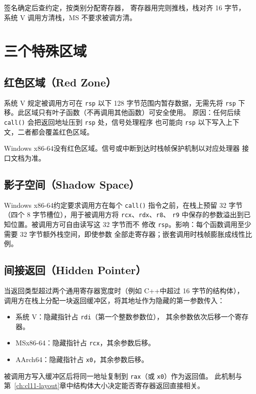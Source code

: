 \documentclass[12pt,a4paper,fontset=fandol]{ctexbook}
\newcommand{\cpp}[1]{C++#1}
\newcommand{\Fn}[1]{\texttt{#1()}}
\newcommand{\Tp}[1]{\texttt{#1}}
\newcommand{\Win}{\textsf{Windows}}
\newcommand{\xSixtyFour}{\textsf{x86-64}}
\newcommand{\ArmSixtyFour}{\textsf{AArch64}}
\begin{document}
\begin{flow}[title={参数去向}]
签名确定后查约定，按类别分配寄存器，
寄存器用完则推栈，栈对齐 16 字节，
系统 V 调用方清栈，MS 不要求被调方清。
\end{flow}

\section{三个特殊区域}\label{sec:cl10-special-zones}

\subsection{红色区域（Red Zone）}\label{sec:cl10-redzone}

\begin{abibox}[title={红色区域}]
系统 V 规定被调用方可在 \Tp{rsp} 以下 128 字节范围内暂存数据，无需先将
\Tp{rsp} 下移。此区域只有叶子函数（不再调用其他函数）可安全使用。
原因：任何后续 \Fn{call} 会把返回地址压到 \Tp{rsp} 处，信号处理程序
也可能向 \Tp{rsp} 以下写入上下文，二者都会覆盖红色区域。
\end{abibox}

\Win{} \xSixtyFour 没有红色区域。信号或中断到达时栈帧保护机制以对应处理器
接口文档为准。

\subsection{影子空间（Shadow Space）}\label{sec:cl10-shadow}

\begin{abibox}[title={影子空间}]
\Win{} \xSixtyFour 约定要求调用方在每个 \Fn{call} 指令之前，在栈上预留
32 字节（四个 8 字节槽位），用于被调用方将 \Tp{rcx}、\Tp{rdx}、\Tp{r8}、
\Tp{r9} 中保存的参数溢出到已知位置。被调用方可自由读写这 32 字节而不
修改 \Tp{rsp}。影响：每个函数调用至少需要 32 字节额外栈空间，即使参数
全部走寄存器；嵌套调用时栈帧膨胀成线性比例。
\end{abibox}

\subsection{间接返回（Hidden Pointer）}\label{sec:cl10-indirect}

当返回类型超过两个通用寄存器宽度时（例如 \cpp 中超过 16 字节的结构体），
调用方在栈上分配一块返回缓冲区，将其地址作为隐藏的第一参数传入：
\begin{itemize}
\item 系统 V：隐藏指针占 \Tp{rdi}（第一个整数参数位），
      其余参数依次后移一个寄存器。
\item MS\xSixtyFour：隐藏指针占 \Tp{rcx}，其余参数后移。
\item \ArmSixtyFour：隐藏指针占 \Tp{x0}，其余参数后移。
\end{itemize}
被调用方写入缓冲区后将同一地址复制到 \Tp{rax}（或 \Tp{x0}）作为返回值。
此机制与第~\ref{ch:cl11-layout}章中结构体大小决定能否寄存器返回直接相关。
\end{document}
